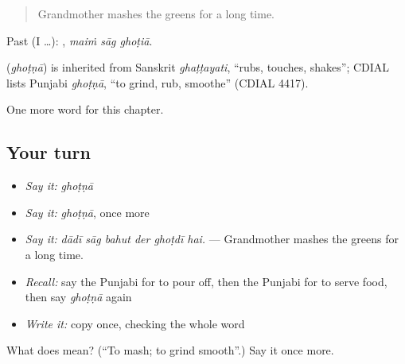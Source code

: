 \begin{quote}
Grandmother mashes the greens for a long time.
\end{quote}

Past (I …):   , \emph{maiṁ sāg ghoṭiā}.

\begin{cousinweb}
\textbf{} (\emph{ghoṭṇā}) is inherited from Sanskrit \emph{ghaṭṭayati}, \textquotedblleft{}rubs, touches, shakes\textquotedblright{}; CDIAL lists Punjabi \emph{ghoṭṇā}, \textquotedblleft{}to grind, rub, smoothe\textquotedblright{} (CDIAL 4417).
\end{cousinweb}

\begin{grammarlens}[title={What you've built}]
One more word for this chapter.
\end{grammarlens}

\subsection*{Your turn}
\begin{itemize}
\raggedright
  \item \emph{Say it:} \emph{ghoṭṇā}
  \item \emph{Say it:} \emph{ghoṭṇā}, once more
  \item \emph{Say it:} \emph{dādī sāg bahut der ghoṭdī hai.} — Grandmother mashes the greens for a long time.
  \item \emph{Recall:} say the Punjabi for to pour off, then the Punjabi for to serve food, then say \emph{ghoṭṇā} again
  \item \emph{Write it:} copy \textbf{} once, checking the whole word
\end{itemize}

\begin{tcolorbox}[breakable,colback=teal!4,colframe=teal!35!black,title={Before you move on}]
What does  mean? (\textquotedblleft{}To mash; to grind smooth\textquotedblright{}.) Say it once more.
\end{tcolorbox}
